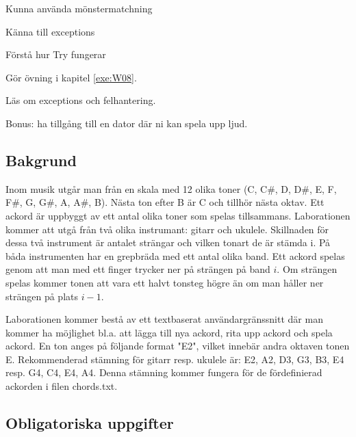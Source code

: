 

\Lab{\LabWeekEIGHT}

\begin{Goals}
\item Kunna använda mönstermatchning
\item Känna till exceptions
\item Förstå hur Try fungerar

\end{Goals}

\begin{Preparations}
\item Gör övning {\tt \ExeWeekEIGHT} i kapitel \ref{exe:W08}.
\item Läs om exceptions och felhantering.
\item Bonus: ha tillgång till en dator där ni kan spela upp ljud.
\end{Preparations}

\subsection{Bakgrund}
Inom musik utgår man från en skala med 12 olika toner (C, C\#, D, D\#, E, F, F\#,
G, G\#, A, A\#, B). Nästa ton efter B är C och tillhör nästa oktav.
Ett ackord är uppbyggt av ett antal olika toner som spelas tillsammans.
Laborationen kommer att utgå från två olika instrumant: gitarr och ukulele.
Skillnaden för dessa två instrument är antalet strängar och vilken tonart
de är stämda i. På båda instrumenten har en grepbräda med ett antal olika band.
Ett ackord spelas genom att man med ett finger trycker ner på strängen på band
$i$. Om strängen spelas kommer tonen att vara ett halvt tonsteg högre än om man
håller ner strängen på plats $i-1$.

Laborationen kommer bestå av ett textbaserat användargränssnitt
där man kommer ha möjlighet bl.a. att lägga till nya ackord, rita upp ackord och
spela ackord. En ton anges på följande format "E2", vilket innebär andra oktaven
tonen E. Rekommenderad stämning för gitarr resp. ukulele är: E2, A2, D3, G3, B3,
E4 resp. G4, C4, E4, A4. Denna stämning kommer fungera för de fördefinierad
ackorden i filen chords.txt.

\subsection{Obligatoriska uppgifter}

